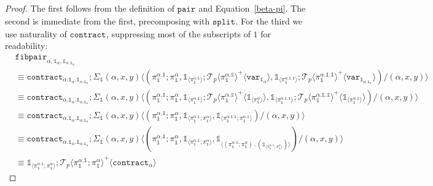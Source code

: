 \documentclass[10pt]{article}
\theoremstyle{definition}
\newcommand\ApEl[2]{\mathcal{T}_{#1}\langle#2\rangle}
\newcommand\bdot[0]{\mathbin{.}}
\newcommand\ap[2]{\ensuremath{#1 \langle #2 \rangle }}
\newcommand\ApPlus[2]{\ensuremath{{#1}^+ \langle #2 \rangle }}
\newcommand\One{\ensuremath{\mathds{1}}}
\newcommand\var[1]{\ensuremath{\mathtt{var}_{#1}}}
\newcommand\ApOne[1]{\ensuremath{\One_{\langle {#1} \rangle }}}
\newcommand\contract[1]{\ensuremath{\mathtt{contract}_{#1}}}
\newcommand\fibpair[1]{\ensuremath{\mathtt{fibpair}_{#1}}}
\newcommand\pair[1]{\ensuremath{\mathtt{pair}_{#1}}}
\newcommand\tsplit[1]{\ensuremath{\mathtt{split}_{#1}}}
\begin{document}
\begin{proof}
The first follows from the definition of $\pair{}$ and Equation~\ref{beta-pi}. The second is immediate from the first, precomposing with $\tsplit{}$. For the third we use naturality of $\contract{}$, suppressing most of the subscripts of $1$ for readability:
\begin{align*}
&\fibpair{\alpha,\One_\alpha,\One_{\alpha.\One_\alpha}} \\
&\equiv \contract{\alpha.\One_\alpha.\One_{\alpha.\One_\alpha}};\ap{\Sigma_\One(\alpha,x,y)}{(\pi^{\alpha.\One}_\One;\pi^{\alpha}_\One,\ApOne{\pi^{\alpha.\One}_\One};\ApPlus{\ApEl{p}{\pi^{\alpha.\One}_\One}}{\var{\One_\alpha}}, \ApOne{\pi^{\alpha.\One.\One}_\One};\ApPlus{\ApEl{p}{\pi^{\alpha.\One.\One}_\One}}{\var{\One_{\alpha.\One_\alpha}}})/(\alpha,x,y)} \\
&\equiv \contract{\alpha.\One_\alpha.\One_{\alpha.\One_\alpha}};\ap{\Sigma_\One(\alpha,x,y)}{(\pi^{\alpha.\One}_\One;\pi^{\alpha}_\One,\ApOne{\pi^{\alpha.\One}_\One};\ApPlus{\ApEl{p}{\pi^{\alpha.\One}_\One}}{\ApOne{\pi^\alpha_\One}}, \ApOne{\pi^{\alpha.\One.\One}_\One};\ApPlus{\ApEl{p}{\pi^{\alpha.\One.\One}_\One}}{\ApOne{\pi^{\alpha.\One}_\One}})/(\alpha,x,y)} \\
&\equiv \contract{\alpha.\One_\alpha.\One_{\alpha.\One_\alpha}};\ap{\Sigma_\One(\alpha,x,y)}{(\pi^{\alpha.\One}_\One;\pi^{\alpha}_\One,\ApOne{\pi^{\alpha.\One}_\One;\pi^\alpha_\One}, \ApOne{\pi^{\alpha.\One.\One}_\One;\pi^{\alpha.\One}_\One})/(\alpha,x,y)} \\
&\equiv \contract{\alpha.\One_\alpha.\One_{\alpha.\One_\alpha}};\ap{\Sigma_\One(\alpha,x,y)}{(\pi^{\alpha.\One}_\One;\pi^{\alpha}_\One,\ApOne{\pi^{\alpha.\One}_\One;\pi^\alpha_\One}, \ApOne{(\pi^{\alpha.\One}_\One;\pi^{\alpha}_\One) \bdot (\ApOne{\pi^{\alpha.\One}_\One;\pi^{\alpha}_\One})})/(\alpha,x,y)} \\
&\equiv \ApOne{\pi^{\alpha.\One}_\One;\pi^{\alpha}_\One};\ApPlus{\ApEl{p}{\pi^{\alpha.\One}_\One;\pi^{\alpha}_\One}}{\contract{\alpha}}

\end{align*}
\end{proof}
\end{document}
